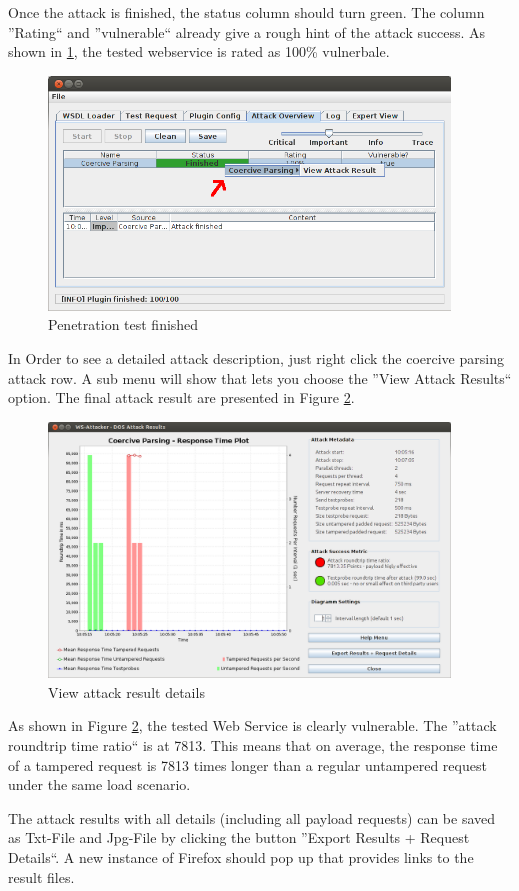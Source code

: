 Once the attack is finished, the status column should turn green. The column ''Rating`` and ''vulnerable`` already give a rough hint of the attack success.
As shown in  \ref{fig:dosStep4_2}, the tested webservice is rated as 100\% vulnerbale. 
\begin{figure}[ht!]
    \begin{center}
        \includegraphics[width=0.95\textwidth]{img/dosStep4_2.png}
    \end{center}
    \caption{Penetration test finished}
    \label{fig:dosStep4_2}
\end{figure}

In Order to see a detailed attack description, just right click the coercive parsing attack row. 
A sub menu will show that lets you choose the ''View Attack Results`` option. The final attack result are presented in Figure \ref{fig:dosStep4_3}.
\begin{figure}[H]
    \begin{center}
        \includegraphics[width=0.95\textwidth]{img/dosStep4_3.png}
    \end{center}
    \caption{View attack result details}
    \label{fig:dosStep4_3}
\end{figure}
As shown in Figure \ref{fig:dosStep4_3}, the tested Web Service is clearly vulnerable. 
The ''attack roundtrip time ratio`` is at 7813. This means that on average, the response time of a tampered request is 7813 times longer than a regular untampered request under the same load scenario.

The attack results with all details (including all payload requests) can be saved as Txt-File and Jpg-File by clicking the button ''Export Results + Request Details``.
A new instance of Firefox should pop up that provides links to the result files.
